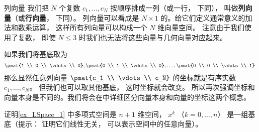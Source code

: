
\begin{exercise}{列向量}
我们把 $N$ 个复数 $c_1, \dots, c_N$ 按顺序排成一列（或一行， 下同）， 叫做\textbf{列向量}（或\textbf{行向量}， 下同）。 列向量可以看成是 $N \times 1$ 的。给它们定义通常意义的加法和数乘运算， 这样所有列向量可以构成一个 $N$ 维向量空间。 注意由于我们使用了复数， 即使 $N \leqslant 3$ 时我们也无法将这些向量与几何向量对应起来。

如果我们将基底取为
$$
\pmat{1 \\ 0 \\ \vdots \\ 0}, \pmat{0 \\ 1 \\ \vdots \\ 0}, \dots, \pmat{0 \\ 0 \\ \vdots \\ 1}~
$$
那么显然任意列向量 $\pmat{c_1 \\ \vdots \\ c_N}$ 的坐标就是有序实数 $c_1, \dots, c_N$。 但我们也可以取其他基底， 这时坐标就会改变。 所以再次强调坐标和向量本身是不同的。我们将会在中详细区分向量本身和向量的坐标这两个概念。
\end{exercise}

\begin{exercise}{}
证明\autoref{ex_LSpace_1} 中多项式空间是 $n+1$ 维空间， $x^k$ （$k = 0, \dots, n$） 是一组基底（提示： 证明它们线性无关， 可以表示空间中的任意向量）。
\end{exercise}



